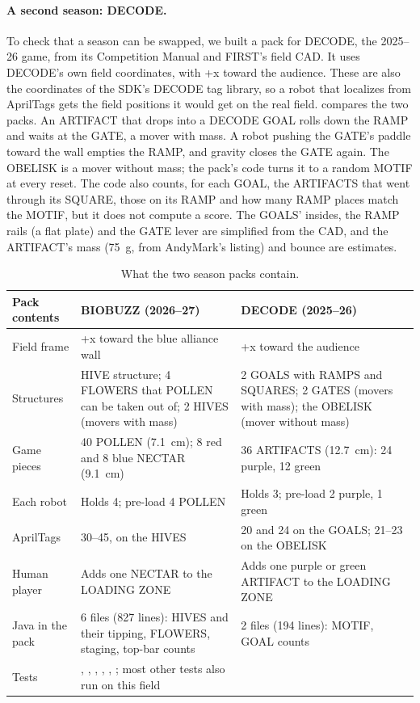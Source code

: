 \documentclass[10pt,twocolumn,letterpaper]{article}
\begin{document}
\paragraph{A second season: DECODE.} To check that a season can be swapped, we built a pack for DECODE, the 2025–26 game, from its Competition Manual \citep{first2025decode} and FIRST's field CAD. It uses DECODE's own field coordinates, with +x toward the audience. These are also the coordinates of the SDK's DECODE tag library, so a robot that localizes from AprilTags gets the field positions it would get on the real field.  compares the two packs. An ARTIFACT that drops into a DECODE GOAL rolls down the RAMP and waits at the GATE, a mover with mass. A robot pushing the GATE's paddle toward the wall empties the RAMP, and gravity closes the GATE again. The OBELISK is a mover without mass; the pack's code turns it to a random MOTIF at every reset. The code also counts, for each GOAL, the ARTIFACTS that went through its SQUARE, those on its RAMP and how many RAMP places match the MOTIF, but it does not compute a score. The GOALS' insides, the RAMP rails (a flat plate) and the GATE lever are simplified from the CAD, and the ARTIFACT's mass (75~g, from AndyMark's listing) and bounce are estimates.

\begin{table}[t]
\centering
\footnotesize
\caption{What the two season packs contain.}\label{tab:seasons}
\begin{tabularx}{\columnwidth}{@{}>{\raggedright\arraybackslash}p{1.45cm}LL@{}}
\toprule
\textbf{Pack contents} & \textbf{BIOBUZZ (2026–27)} & \textbf{DECODE (2025–26)} \\
\midrule
Field frame & +x toward the blue alliance wall & +x toward the audience \\
Structures & HIVE structure; 4 FLOWERS that POLLEN can be taken out of; 2 HIVES (movers with mass) & 2 GOALS with RAMPS and SQUARES; 2 GATES (movers with mass); the OBELISK (mover without mass) \\
Game pieces & 40 POLLEN (7.1~cm); 8 red and 8 blue NECTAR (9.1~cm) & 36 ARTIFACTS (12.7~cm): 24 purple, 12 green \\
Each robot & Holds 4; pre-load 4 POLLEN & Holds 3; pre-load 2 purple, 1 green \\
AprilTags & 30–45, on the HIVES & 20 and 24 on the GOALS; 21–23 on the OBELISK \\
Human player & Adds one NECTAR to the LOADING ZONE & Adds one purple or green ARTIFACT to the LOADING ZONE \\
Java in the pack & 6 files (827 lines): HIVES and their tipping, FLOWERS, staging, top-bar counts & 2 files (194 lines): MOTIF, GOAL counts \\
Tests & , , , , , ; most other tests also run on this field &  \\
\bottomrule
\end{tabularx}
\end{table}
\end{document}
